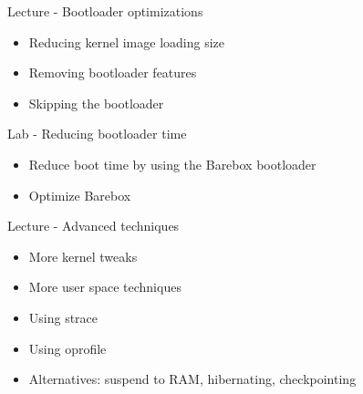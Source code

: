 \documentclass[a4paper,12pt,obeyspaces,spaces,hyphens]{article}
\begin{document}
\feagendatwocolumn
{Lecture - Bootloader optimizations}
{
  \begin{itemize}
  \item Reducing kernel image loading size
  \item Removing bootloader features
  \item Skipping the bootloader
  \end{itemize}
}
{Lab - Reducing bootloader time}
{
 \begin{itemize}
 \item Reduce boot time by using the Barebox bootloader
 \item Optimize Barebox
 \end{itemize}
}

\feagendaonecolumn
{Lecture - Advanced techniques}
{
  \begin{itemize}
  \item More kernel tweaks
  \item More user space techniques
  \item Using strace
  \item Using oprofile
  \item Alternatives: suspend to RAM, hibernating, checkpointing
  \end{itemize}
}
\end{document}
